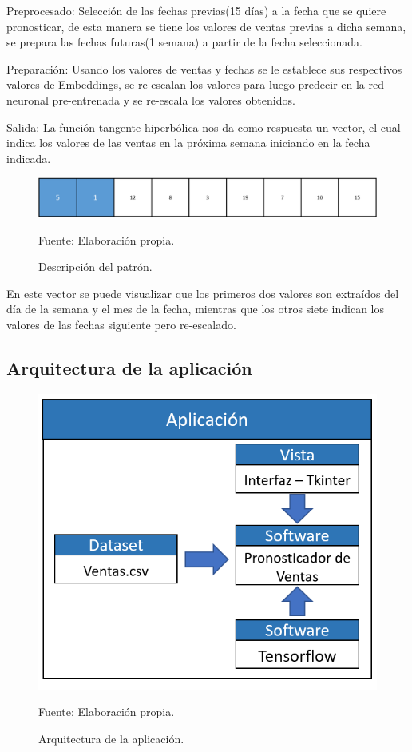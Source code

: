 Preprocesado:
Selección de las fechas previas(15 días) a la fecha que se quiere pronosticar, de esta manera se tiene los valores de ventas previas a dicha semana, se prepara las fechas futuras(1 semana) a partir de la fecha seleccionada.

Preparación:
Usando los valores de ventas y fechas se le establece sus respectivos valores de Embeddings, se re-escalan los valores para luego predecir en la red neuronal pre-entrenada y se re-escala los valores obtenidos.

Salida:
La función tangente hiperbólica nos da como respuesta un vector, el cual indica los valores de las ventas en la próxima semana iniciando en la fecha indicada.

\begin{figure}[h!]
	\centering
		\includegraphics[scale=0.4]{imagenes/vectorcaracteristico.png}
		\caption{Descripción del patrón.}
	\begin{center}
    Fuente: Elaboración propia.
    \end{center}
	\label{fig:DescriPatron}
\end{figure}
En este vector se puede visualizar que los primeros dos valores son extraídos del día de la semana y el mes de la fecha, mientras que los otros siete indican los valores de las fechas siguiente pero re-escalado.
\subsection{Arquitectura de la aplicación}
\begin{figure}[h!]
	\centering
		\includegraphics[scale=0.4]{imagenes/arquitecturaaplicacion.png}
		\caption{Arquitectura de la aplicación.}
	\begin{center}
    Fuente: Elaboración propia.
    \end{center}
	\label{fig:arquitecturaaaa}
\end{figure}

